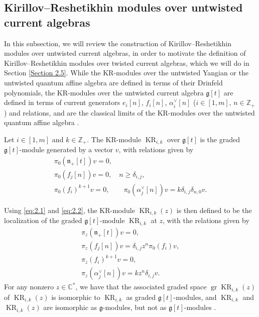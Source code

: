 \documentclass[pdftex]{sigma}
\numberwithin{equation}{section}
\DeclareMathOperator{\gr}{gr}
\DeclareMathOperator{\KR}{KR}
\begin{document}
\subsection{Kirillov--Reshetikhin modules over untwisted current algebras}\label{Section 2.3}

In this subsection, we will review the construction of Kirillov--Reshetikhin modules over untwisted current algebras, in order to motivate the definition of Kirillov--Reshetikhin modules over twisted current algebras, which we will do in Section \ref{Section 2.5}. While the KR-modules over the untwisted Yangian or the untwisted quantum affine algebra are defined in terms of their Drinfeld polynomials, the KR-modules over the untwisted current algebra $\mathfrak{g}[t]$ are defined in terms of current generators $e_i[n]$, $f_i[n]$, $\alpha_i^{\vee}[n]$ ($i\in[1,m]$, $n\in\mathbb{Z}_+$) and relations, and are the classical limits of the KR-modules over the untwisted quantum affine algebra \cite{CM06, Kedem11}.

\begin{Definition}[{\cite[Definition 2.1]{CM06}}]\label{2.1}
Let $i\in[1,m]$ and $k\in\mathbb{Z}_+$. The KR-module $\KR_{i,k}$ over $\mathfrak{g}[t]$ is the graded $\mathfrak{g}[t]$-module generated by a vector $v$, with relations given by
\begin{gather}
\pi_0(\mathfrak{n}_+[t])v=0,\nonumber\\
\pi_0(f_j[n])v=0,\quad n\geq\delta_{i,j},\nonumber\\
\pi_0(f_i)^{k+1}v=0,\qquad
\pi_0(\alpha_j^{\vee}[n])v=k\delta_{i,j}\delta_{n,0}v.\label{eq:2.2}
\end{gather}
\end{Definition}

Using \eqref{eq:2.1} and \eqref{eq:2.2}, the KR-module $\KR_{i,k}(z)$ is then defined to be the localization of the graded $\mathfrak{g}[t]$-module $\KR_{i,k}$ at $z$, with the relations given by
\begin{subequations}\label{eq:2.3}
\begin{gather}
\pi_z(\mathfrak{n}_+[t]) v=0,\\
\pi_z(f_j[n])v=\delta_{i,j}z^n\pi_0(f_i)v,\label{eq:2.3b}\\
\pi_z(f_i)^{k+1}v=0,\\
\pi_z(\alpha_j^{\vee}[n])v=kz^n\delta_{i,j}v.
\end{gather}
\end{subequations}
For any nonzero $z\in\mathbb{C}^*$, we have that the associated graded space $\gr \KR_{i,k}(z)$ of $\KR_{i,k}(z)$ is isomorphic to $\KR_{i,k}$ as graded $\mathfrak{g}[t]$-modules, and $\KR_{i,k}$ and $\KR_{i,k}(z)$ are isomorphic as $\mathfrak{g}$-modules, but not as $\mathfrak{g}[t]$-modules \cite{CM06}.
\end{document}
